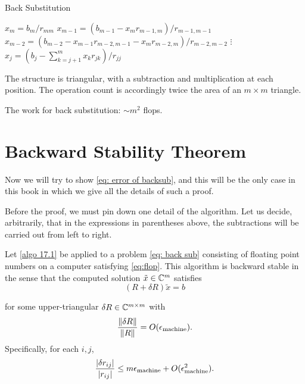 \begin{algorithm}[H]
    \caption{Back Substitution}
    \label{algo 17.1}
    $x_m = b_m /r_{ mm } $\; 
    $x_{ m-1 } =(b_{ m-1 } -x_m r_{ m-1,m } )/r_{ m-1,m-1 } $\; 
    $x_{m-2} = (b_{ m-2 } -x_{m-1} r_{ m-2,m-1 } -x_m r_{ m-2,m } )/r_{ m-2,m-2 } $\; 
    $\vdots$ \; 
    $ x_j = (b_j - \sum_{k=j+1}^{m} x_kr_{ jk } )/r_{jj}$ 
\end{algorithm}

The structure is triangular, with a subtraction and multiplication at each position. The operation count is accordingly twice the area of an $m\times m$ triangle. 


\begin{corollary}
\label{cor: Work for backsub}
The work for back substitution: $ \sim m^2 $ flops.  
\end{corollary}

\section{Backward Stability Theorem} 
Now we will try to show \eqref{eq: error of backsub}, and this will be the only case in this book in which we give all the details of such a proof.  

Before the proof, we must pin down one detail of the algorithm. Let us decide, arbitrarily, that in the expressions in parentheses above, the subtractions will be carried out from left to right.  


\begin{theorem}
\label{thm: Backstap of backsub}
Let \autoref{algo 17.1} be applied to a problem \eqref{eq: back sub} consisting of floating point numbers on a computer satisfying \eqref{eq:flop}. This algorithm is backward stable in the sense that the computed solution $\tilde x \in \mathbb{C}^m$ satisfies 
\begin{equation}
    \label{eq: backstap of backsub}
    (R+ \delta  R) \tilde x = b
\end{equation}

for some upper-triangular $ \delta R \in \mathbb{C}^{m\times m} $ with 
\begin{equation}
    \label{eq: err of backstap of backsub}
    \frac{\|\delta  R\|}{\|R\|} = O(\epsilon_{\text{machine}}). 
\end{equation}
Specifically, for each $i,j$, 
\begin{equation}
    \label{eq: pointwise err of backstap of backsub}
    \frac{|\delta r_{ij}|}{|r_{ij}|} \le m \epsilon_{\text{machine}} + O(\epsilon_{\text{machine}}^2).  
\end{equation}
\end{theorem}

